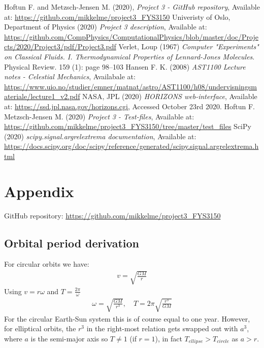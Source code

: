 \documentclass[american,a4paper,12pt]{article}
\begin{document}
\newpage
\begin{thebibliography}{}
 Hoftun F. and Metzsch-Jensen M. (2020), \textit{Project 3 - GitHub repository}, Available at: \url{https://github.com/mikkelme/project3_FYS3150}
 Univeristy of Oslo, Department of Physics (2020) \textit{Project 3 description}, Available at: \url{https://github.com/CompPhysics/ComputationalPhysics/blob/master/doc/Projects/2020/Project3/pdf/Project3.pdf}
 Verlet, Loup (1967) \textit{Computer "Experiments" on Classical Fluids. I. Thermodynamical Properties of Lennard-Jones Molecules}. Physical Review. 159 (1): page 98–103
 Hansen F. K. (2008) \textit{AST1100 Lecture notes - Celestial Mechanics}, Availabale at: \url{https://www.uio.no/studier/emner/matnat/astro/AST1100/h08/undervisningsmateriale/lecture1_v2.pdf}
 NASA, JPL (2020) \textit{HORIZONS web-interface}, Available at: \url{https://ssd.jpl.nasa.gov/horizons.cgi}, Accessed October 23rd 2020.
 Hoftun F. Metzsch-Jensen M. (2020) \textit{Project 3 - Test-files}, Available at: \url{https://github.com/mikkelme/project3_FYS3150/tree/master/test_files}
 SciPy (2020) \textit{scipy.signal.argrelextrema documentation}, Available at: \url{https://docs.scipy.org/doc/scipy/reference/generated/scipy.signal.argrelextrema.html}
\end{thebibliography}

\newpage
\section*{Appendix}
GitHub repository: \url{https://github.com/mikkelme/project3_FYS3150}


\subsection{Orbital period derivation}
For circular orbits we have:
\begin{align*}
    v = \sqrt{\frac{GM}{r}}
\end{align*}
Using $v = r\omega$ and $T = \frac{2\pi}{\omega}$
\begin{align*}
    \omega = \sqrt{\frac{GM}{r^3}}, \quad T = 2\pi \sqrt{\frac{r^3}{GM}}
\end{align*}
For the circular Earth-Sun system this is of course equal to one year. However, for elliptical orbits, the $r^3$ in the right-most relation gets swapped out with $a^3$, where $a$ is the semi-major axis so $T \neq 1$ (if $r = 1$), in fact $T_{ellipse} > T_{circle}$ as $a > r$.
\end{document}

